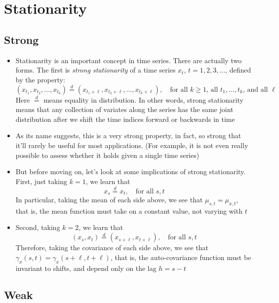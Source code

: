 \documentclass{article}
\begin{document}
\section{Stationarity}
\def\eqd{\overset{d}{=}}

\subsection{Strong}

\begin{itemize}
\item Stationarity is an important concept in time series. There are actually
  two forms. The first is \emph{strong stationarity} of a time series $x_t$,
  $t = 1,2,3,\dots$, defined by the property:
  \[
  (x_{t_1}, x_{t_2}, \dots, x_{t_k}) \eqd (x_{t_1+\ell}, x_{t_2+\ell}, \dots,
  x_{t_k+\ell}), \quad \text{for all $k \geq 1$, all $t_1,\dots,t_k$, and all
    $\ell$}   
  \]
  Here $\eqd$ means equality in distribution. In other words, strong
  stationarity means that any collection of variates along the series has the
  same joint distribution after we shift the time indices forward or backwards
  in time  

\item As its name suggests, this is a very strong property, in fact, so strong 
  that it'll rarely be useful for most applications. (For example, it is not
  even really possible to assess whether it holds given a single time series)  

\item But before moving on, let's look at some implications of strong 
  stationarity. First, just taking $k=1$, we learn that
  \[
  x_s \eqd x_t, \quad \text{for all $s,t$}
  \]
  In particular, taking the mean of each side above, we see that $\mu_{s,t} =
  \mu_{x,t}$, that is, the mean function must take on a constant value, not
  varying with $t$

\item Second, taking $k=2$, we learn that 
  \[
  (x_s, x_t) \eqd (x_{s+\ell}, x_{t+\ell}), \quad \text{for all $s,t$} 
  \]
  Therefore, taking the covariance of each side above, we see that
  $\gamma_x(s,t) = \gamma_x(s+\ell, t+\ell)$, that is, the auto-covariance
  function must be invariant to shifts, and depend only on the lag $h = s-t$  
\end{itemize}

\subsection{Weak}
\end{document}
